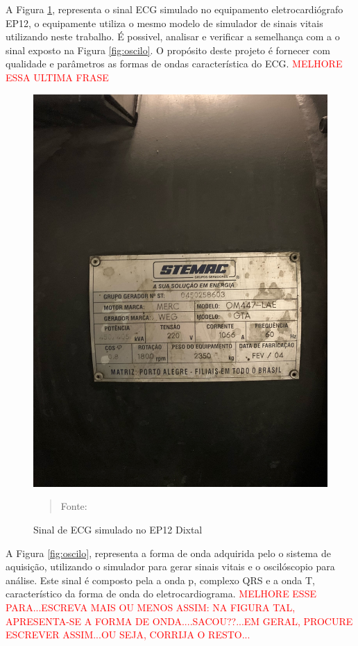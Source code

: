 A Figura \ref{fig:popi}, representa o sinal ECG simulado no equipamento eletrocardiógrafo EP12, o equipamente utiliza o mesmo modelo de simulador de sinais vitais utilizando neste trabalho. É possivel, analisar e verificar a semelhança com a o sinal exposto na Figura  \ref{fig:oscilo}.  O propósito deste projeto é fornecer com qualidade e parâmetros as formas de ondas característica do ECG. \textcolor{red}{MELHORE ESSA ULTIMA FRASE}

\begin{figure}[H]
\begin{center}
			\caption{Sinal de ECG simulado no EP12 Dixtal}
			\includegraphics[width=.8\textwidth]{Figuras/info_gerador_450.jpeg}
              \vspace*{\fill} 
            \begin{quote} 
            \centering 
           Fonte: \cite{ronald}
            \end{quote}
            \vspace*{\fill}
			\label{fig:popi}
\end{center}
\end{figure}

A Figura \ref{fig:oscilo}, representa a forma de onda adquirida pelo o sistema de aquisição, utilizando o simulador para gerar sinais vitais e o oscilóscopio para análise. Este sinal é composto pela a onda p, complexo QRS e a onda T, característico da forma de onda do eletrocardiograma. \textcolor{red}{MELHORE ESSE PARA...ESCREVA MAIS OU MENOS ASSIM: NA FIGURA TAL, APRESENTA-SE A FORMA DE ONDA....SACOU??...EM GERAL, PROCURE ESCREVER ASSIM...OU SEJA, CORRIJA O RESTO...}

